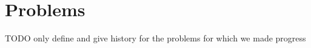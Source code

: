 \part{Problems}

TODO only define and give history for the problems for which we made progress








%



